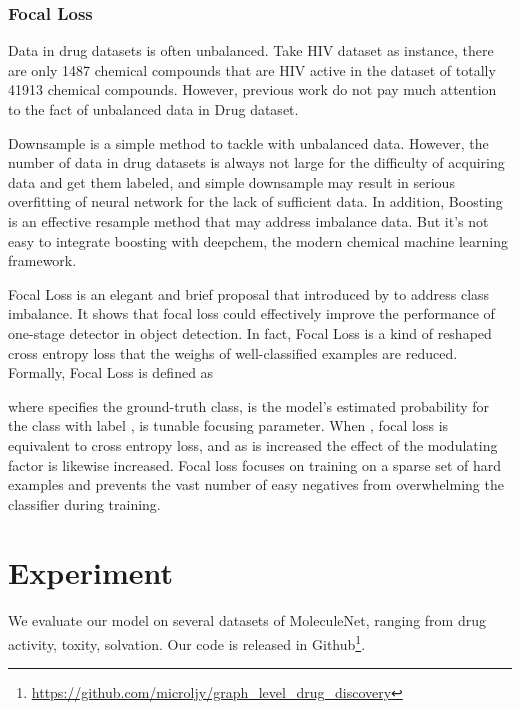 \documentclass[letterpaper]{article} \usepackage{aaai18}  \usepackage{times}  \usepackage{helvet}  \usepackage{courier}  \usepackage{url}  \usepackage{graphicx}  \usepackage{amsmath}
\begin{document}
\subsubsection{Focal Loss}
Data in drug datasets is often unbalanced. Take HIV dataset as instance, there are only 1487 chemical compounds that are HIV active in the dataset of totally 41913 chemical compounds. However, previous work\cite{altae2017low,wu2017moleculenet} do not pay much attention to the fact of unbalanced data in Drug dataset.

Downsample is a simple method to tackle with unbalanced data. However, the number of data in drug datasets is always not large for the difficulty of acquiring data and get them labeled, and simple downsample may result in serious overfitting of neural network for the lack of sufficient data. In addition, Boosting is an effective resample method that may address imbalance data. But it's not easy to integrate boosting with deepchem\cite{wu2017moleculenet}, the modern chemical machine learning framework. 

Focal Loss is an elegant and brief proposal that introduced by \cite{lin2017focal} to address class imbalance. It shows that focal loss could effectively improve the performance of one-stage detector in object detection. In fact, Focal Loss is a kind of reshaped cross entropy loss that the weighs of well-classified examples are reduced. Formally, Focal Loss is defined as 



where  specifies the ground-truth class,  is the model's estimated probability for the class with label ,  is tunable focusing parameter. When , focal loss is equivalent to cross entropy loss, and as  is increased the effect of the modulating factor is likewise increased. Focal loss focuses on training on a sparse set of hard examples and prevents the vast number of easy negatives from overwhelming the classifier during training.




\section{Experiment}
We evaluate our model on several datasets of MoleculeNet, ranging from drug activity, toxity, solvation. Our code is released in Github\footnote{\url{https://github.com/microljy/graph_level_drug_discovery}}.
\end{document}
